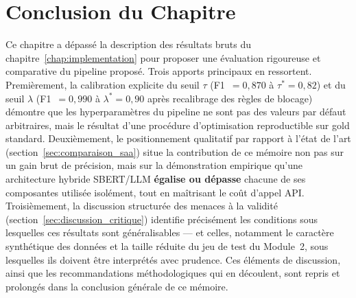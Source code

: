 \section{Conclusion du Chapitre}
\label{sec:chap4_conclusion}

Ce chapitre a dépassé la description des résultats bruts du
chapitre~\ref{chap:implementation} pour proposer une évaluation
rigoureuse et comparative du pipeline proposé. Trois apports principaux
en ressortent. Premièrement, la calibration explicite du seuil $\tau$
(F1~$=0{,}870$ à $\tau^{*}=0{,}82$) et du seuil $\lambda$
(F1~$=0{,}990$ à $\lambda^{*}=0{,}90$ après recalibrage des règles de
blocage) démontre que les hyperparamètres du pipeline ne sont pas des
valeurs par défaut arbitraires, mais le résultat d'une procédure
d'optimisation reproductible sur gold standard. Deuxièmement, le
positionnement qualitatif par rapport à l'état de l'art
(section~\ref{sec:comparaison_saa}) situe la contribution de ce
mémoire non pas sur un gain brut de précision, mais sur la
démonstration empirique qu'une architecture hybride
SBERT/LLM \textbf{égalise ou dépasse} chacune de ses composantes
utilisée isolément, tout en maîtrisant le coût d'appel API.
Troisièmement, la discussion structurée des menaces à la validité
(section~\ref{sec:discussion_critique}) identifie précisément les
conditions sous lesquelles ces résultats sont généralisables --- et
celles, notamment le caractère synthétique des données et la taille
réduite du jeu de test du Module~2, sous lesquelles ils doivent être
interprétés avec prudence. Ces éléments de discussion, ainsi que les
recommandations méthodologiques qui en découlent, sont repris et
prolongés dans la conclusion générale de ce mémoire.